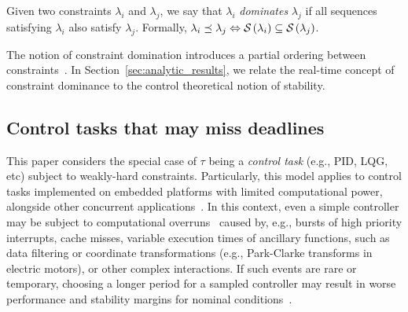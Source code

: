 \begin{definition}%
    \label{def:domination}%
    Given two constraints $\lambda_i$ and $\lambda_j$, we say that $\lambda_i$ \emph{dominates} $\lambda_j$ if all sequences satisfying $\lambda_i$ also satisfy $\lambda_j$.
    Formally, $\lambda_i \preceq \lambda_j \Leftrightarrow \mathcal{S}_{}\left(  \lambda_i  \right) \subseteq \mathcal{S}_{}\left(  \lambda_j  \right)$. 
\end{definition}
The notion of constraint domination introduces a partial ordering between constraints~\cite{Bernat:2001}.
In Section~\ref{sec:analytic_results}, we relate the real-time concept of constraint dominance to the control theoretical notion of stability.


\subsection{Control tasks that may miss deadlines}
\label{sec:back_deadline_miss}
This paper considers the special case of $\tau$ being a \emph{control task} (e.g., PID, LQG, etc) subject to weakly-hard constraints.
%
Particularly, this model applies to control tasks implemented on embedded platforms with limited computational power, alongside other concurrent applications~\cite{pazzaglia2021adaptive}. 
In this context, even a simple controller may be subject to computational overruns~\cite{akesson2020empirical} caused by, e.g., bursts of high priority interrupts, cache misses, variable execution times of ancillary functions, such as data filtering or coordinate transformations (e.g., Park-Clarke transforms in electric motors), or other complex interactions.
If such events are rare or temporary, choosing a longer period for a sampled controller may result in worse performance and stability margins for nominal conditions~\cite{Pazzaglia:2019}.

